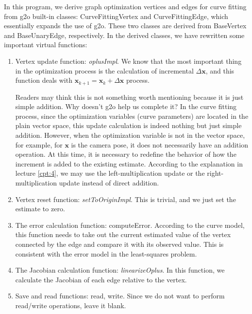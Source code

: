 In this program, we derive graph optimization vertices and edges for curve fitting from g2o built-in classes: CurveFittingVertex and CurveFittingEdge, which essentially expands the use of g2o. These two classes are derived from BaseVertex and BaseUnaryEdge, respectively. In the derived classes, we have rewritten some important virtual functions:
\begin{enumerate}
    \item Vertex update function: \textit{oplusImpl}. We know that the most important thing in the optimization process is the calculation of incremental $\Delta \mathbf{x}$, and this function deals with $\mathbf{x}_{k+1} = \mathbf{x}_k + \Delta \mathbf{x}$ process.

    Readers may think this is not something worth mentioning because it is just simple addition. Why doesn't g2o help us complete it? In the curve fitting process, since the optimization variables (curve parameters) are located in the plain vector space, this update calculation is indeed nothing but just simple addition. However, when the optimization variable is not in the vector space, for example, for $\mathbf{x}$ is the camera pose, it does not necessarily have an addition operation. At this time, it is necessary to redefine the behavior of how the increment is added to the existing estimate. According to the explanation in lecture \ref{cpt:4}, we may use the left-multiplication update or the right-multiplication update instead of direct addition.

    \item Vertex reset function: \textit{setToOriginImpl}. This is trivial, and we just set the estimate to zero.

    \item The error calculation function: computeError. According to the curve model, this function needs to take out the current estimated value of the vertex connected by the edge and compare it with its observed value. This is consistent with the error model in the least-squares problem.
    
    \item The Jacobian calculation function: \textit{linearizeOplus}. In this function, we calculate the Jacobian of each edge relative to the vertex.

    \item Save and read functions: read, write. Since we do not want to perform read/write operations, leave it blank.
\end{enumerate}


